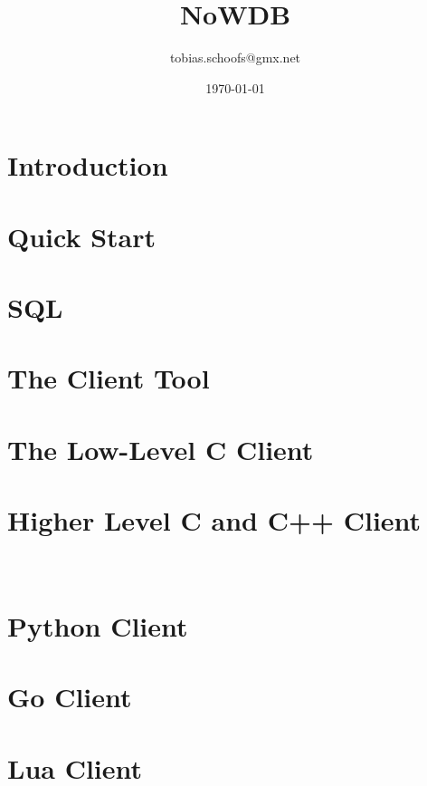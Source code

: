 \documentclass{scrreprt}
\begin{document}
\setlength{\parindent}{0pt}
\setlength{\parskip}{8pt}

\title {NoWDB}
\author {tobias.schoofs@gmx.net}
\date{\today}
\maketitle
\tableofcontents

\chapter{Introduction}\label{chpt_intro} 

\chapter{Quick Start}\label{chpt_quickst}


\chapter{SQL}\label{chpt_sql}


\chapter{The Client Tool}\label{chpt_clienttool}

\chapter{The Low-Level C Client}\label{chpt_llc}

\chapter{Higher Level C and C++ Client}\label{chpt_ccpp}
\CC\

\chapter{Python Client}\label{chpt_pythonclient}

\chapter{Go Client}\label{chpt_goclient}

\chapter{Lua Client}\label{chpt_luaclient}
\end{document}
